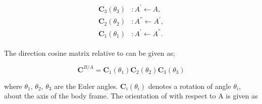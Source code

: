 \begin{align}
\label{eqn:sequence}
\begin{split}
{\bm{C}}_3(\theta_{3}) & :      A^{'} \leftarrow A   ,
\\
{\bm{C}}_2(\theta_{2}) & :      A^{''} \leftarrow A^{'}   ,
\\
{\bm{C}}_1(\theta_{1}) & :      A^{'} \leftarrow A^{''}  .
\end{split}
\end{align}

The direction cosine matrix  relative to  can be given as;

\begin{equation}
\label{eqn:sequentialOrientation}
\bm{C}^{B/A}= \bm{C}_{1}(\theta_{1}) \bm{C}_{2}(\theta_{2}) \bm{C}_{3}(\theta_{3})
\end{equation}

where $\theta_{1}$, $\theta_{2}$, $\theta_{3}$ are the Euler angles. $\bm{C}_{i}(\theta_{i})$  
denotes a rotation of angle $\theta_{i}$, about the axis of the body frame. The orientation of 
with respect to A is given as

